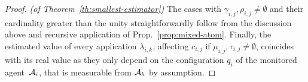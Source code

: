 \begin{proof}{\em (of Theorem~\ref{th:smallest-estimator})}
The cases with $\gamma_{i,j}, \rho_{i,j} \neq \emptyset$ and their cardinality greater than the unity straightforwardly follow from the discussion above and recursive application of Prop.~\ref{prop:mixed-atom}. Finally, the estimated value of every application $\lambda_{i,k}$, affecting $c_{i,j}$ if $\mu_{i,j}, \tau_{i,j} \neq \emptyset$, coincides with its real value as they only depend on the configuration $q_i$ of the monitored agent~$\mathcal{A}_i$, that is measurable from $\mathcal{A}_h$ by assumption.
\end{proof}

\AFnewpage


